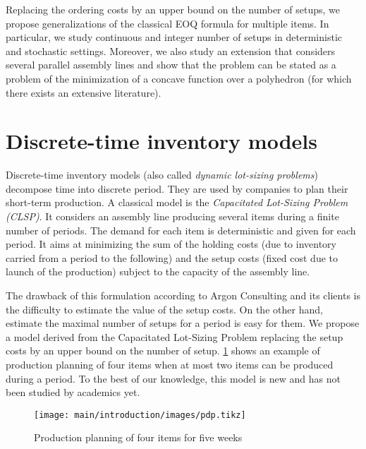 \medskip


Replacing the ordering costs by an upper bound on the number of setups, we propose generalizations of the classical EOQ formula for multiple items.
In particular, we study continuous and integer number of setups in deterministic and stochastic settings.
Moreover, we also study an extension that considers several parallel assembly lines and show that the problem can be stated as a problem of the minimization of a concave function over a polyhedron (for which there exists an extensive literature).




\section{Discrete-time inventory models}
\label{sec:intro:en:discrete-time-inventory-models}


Discrete-time inventory models (also called \emph{dynamic lot-sizing problems}) decompose time into discrete period.
They are used by companies to plan their short-term production.
A classical model is the \emph{Capacitated Lot-Sizing Problem (CLSP)}.
It considers an assembly line producing several items during a finite number of periods.
The demand for each item is deterministic and given for each period.
It aims at minimizing the sum of the holding costs (due to inventory carried from a period to the following) and the setup costs (fixed cost due to launch of the production) subject to the capacity of the assembly line.


The drawback of this formulation according to Argon Consulting and its clients is the difficulty to estimate the value of the setup costs.
On the other hand, estimate the maximal number of setups for a period is easy for them.
We propose a model derived from the Capacitated Lot-Sizing Problem replacing the setup costs by an upper bound on the number of setup.
\cref{fig:intro:en:pdp} shows an example of production planning of four items when at most two items can be produced during a period.
To the best of our knowledge, this model is new and has not been studied by academics yet.

\begin{figure}[!ht]
  \centering
  \texttt{[image: main/introduction/images/pdp.tikz]}
  \caption{Production planning of four items for five weeks}
  \label{fig:intro:en:pdp}
\end{figure}



